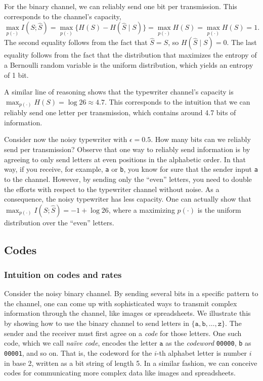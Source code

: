 \begin{example}
For the binary channel, we can reliably send one bit per transmission. This corresponds to the channel's capacity,
%
$$\max_{p(\cdot)} I(S; \hat{S}) = \max_{p(\cdot)} \{ H(S) - H(\hat{S} \mid S) \} = \max_{p(\cdot)} H(S) = \max_{p(\cdot)} H(S) = 1.$$
%
The second equality follows from the fact that $\hat{S} = S$, so $H(\hat{S} \mid S) = 0$. The last equality follows from the fact that the distribution that maximizes the entropy of a Bernoulli random variable is the uniform distribution, which yields an entropy of 1 bit.
\end{example}

\begin{example}
A similar line of reasoning shows that the typewriter channel's capacity is $\max_{p(\cdot)} H(S) = \log 26 \approx 4.7$. This corresponds to the intuition that we can reliably send one letter per transmission, which contains around 4.7 bits of information.
\end{example}

\begin{example}
Consider now the noisy typewriter with $\epsilon = 0.5$. How many bits can we reliably send per transmission? Observe that one way to reliably send information is by agreeing to only send letters at even positions in the alphabetic order. In that way, if you receive, for example, \texttt{a} or \texttt{b}, you know for sure that the sender input \texttt{a} to the channel. However, by sending only the ``even'' letters, you need to double the efforts with respect to the typewriter channel without noise. As a consequence, the noisy typewriter has less capacity. One can actually show that $\max_{p(\cdot)} I(S; \hat{S}) = -1 + \log 26$, where a maximizing $p(\cdot)$ is the uniform distribution over the ``even'' letters.
\end{example}

\subsection{Codes}

\subsubsection*{Intuition on codes and rates}

Consider the noisy binary channel. By sending several bits in a specific pattern to the channel, one can come up with sophisticated ways to transmit complex information through the channel, like images or spreadsheets. We illustrate this by showing how to use the binary channel to send letters in $\{\texttt{a}, \texttt{b}, \ldots, \texttt{z}\}$. The sender and the receiver must first agree on a \emph{code} for those letters. One such code, which we call \emph{na\"ive code}, encodes the letter $\texttt{a}$ as the \emph{codeword} \texttt{00000}, \texttt{b} as \texttt{00001}, and so on. That is, the codeword for the $i$-th alphabet letter is number $i$ in base 2, written as a bit string of length 5. In a similar fashion, we can conceive codes for communicating more complex data like images and spreadsheets.

